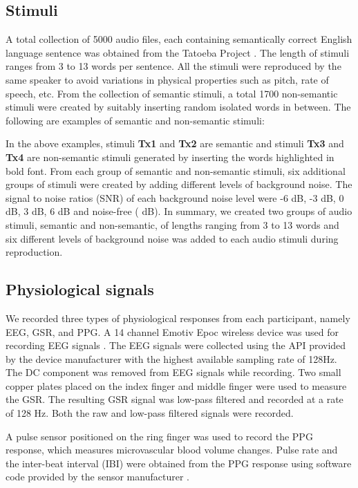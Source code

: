 \documentclass{article}
\begin{document}
\subsection{Stimuli}
\label{ss:stumli}
A total collection of 5000 audio files, each containing semantically correct English language sentence was obtained from the Tatoeba Project \cite{tatoeba}. The length of stimuli ranges from 3 to 13 words per sentence. All the stimuli were reproduced by the same speaker to avoid variations in physical properties such as pitch, rate of speech, etc. From the collection of semantic stimuli, a total 1700 non-semantic stimuli were created by suitably inserting random isolated words in between. The following are examples of semantic and non-semantic stimuli:

In the above examples, stimuli \textbf{Tx1} and \textbf{Tx2} are semantic and stimuli \textbf{Tx3} and \textbf{Tx4} are non-semantic stimuli generated by inserting the words highlighted in bold font. From each group of semantic and non-semantic stimuli, six additional groups of stimuli were created by adding different levels of background noise. The signal to noise ratios (SNR) of each background noise level were -6 dB, -3 dB, 0 dB, 3 dB, 6 dB and noise-free ( dB). In summary, we created two groups of audio stimuli, semantic and non-semantic, of lengths ranging from 3 to 13 words and six different levels of background noise was added to each audio stimuli during reproduction.







\subsection{Physiological signals}
We recorded three types of physiological responses from each participant, namely EEG, GSR, and PPG. A 14 channel Emotiv Epoc wireless device was used for recording EEG signals \cite{EmotivEpoc}. The EEG signals were collected using the API provided by the device manufacturer with the highest available sampling rate of 128Hz. The DC component was removed from EEG signals while recording. Two small copper plates placed on the index finger and middle finger were used to measure the GSR. The resulting GSR signal was low-pass filtered and recorded at a rate of 128 Hz. Both the raw and low-pass filtered signals were recorded. 

A pulse sensor \cite{PPG} positioned on the ring finger was used to record the PPG response, which measures microvascular blood volume changes. Pulse rate and the inter-beat interval (IBI) were obtained from the PPG response using software code provided by the sensor manufacturer \cite{PPGCode}. 
\end{document}
